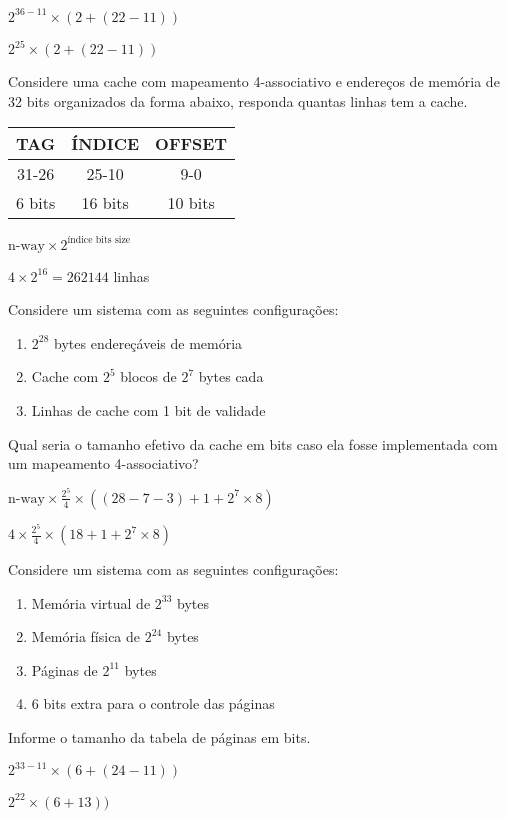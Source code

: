 \documentclass{article}
\begin{document}
$2^{36-11}\times(2+(22-11))$

$2^{25}\times(2+(22-11))$

Considere uma cache com mapeamento 4-associativo e endereços de memória de 32
bits organizados da forma abaixo, responda quantas linhas tem a cache.

\begin{tabular}{|c|c|c|}
\hline TAG & ÍNDICE & OFFSET \\
\hline 31-26 & 25-10 & 9-0 \\
\hline 6 bits & 16 bits & 10 bits \\
\hline
\end{tabular}

$\text{n-way} \times 2^{\text{índice bits size}}$

$4 \times 2^{16} = 262144$ linhas

Considere um sistema com as seguintes configurações:

\begin{enumerate}
\item $2^{28}$ bytes endereçáveis de memória
\item Cache com $2^{5}$ blocos de $2^{7}$ bytes cada
\item Linhas de cache com 1 bit de validade
\end{enumerate}

Qual seria o tamanho efetivo da cache em bits caso ela fosse implementada com
um mapeamento 4-associativo?

$\text{n-way} \times \frac{2^{5}}{4} \times((28-7-3)+1+2^{7}\times8)$

$4 \times \frac{2^{5}}{4}\times(18+1+2^{7}\times8)$

\pagebreak
Considere um sistema com as seguintes configurações:

\begin{enumerate}
\item Memória virtual de $2^{33}$ bytes
\item Memória física de $2^{24}$ bytes
\item Páginas de $2^{11}$ bytes
\item 6 bits extra para o controle das páginas
\end{enumerate}

Informe o tamanho da tabela de páginas em bits.

$2^{33-11}\times(6+(24-11))$

$2^{22}\times(6+13))$
\end{document}
